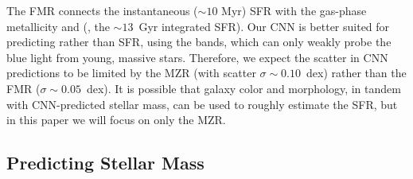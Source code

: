 \documentclass[fleqn,usenatbib]{mnras}
\begin{document}
The FMR connects the instantaneous ($\sim 10$ Myr) SFR with the gas-phase metallicity \citep[$\sim 1$~Gyr timescales; see, e.g.,][]{2011ApJ...734...48L} and \mstar{} (\ie, the $\sim 13$~Gyr integrated SFR). Our CNN is better suited for predicting \mstar{} rather than SFR, using the \sdssg\sdssr\sdssi bands, which can only weakly probe the blue light from young, massive stars. Therefore, we expect the scatter in CNN predictions to be limited by the MZR (with scatter $\sigma \sim 0.10$~dex) rather than the FMR ($\sigma \sim 0.05$~dex). It is possible that galaxy color and morphology, in tandem with CNN-predicted stellar mass, can be used to roughly estimate the SFR, but in this paper we will focus on only the MZR.


\subsection{Predicting Stellar Mass}
\end{document}
